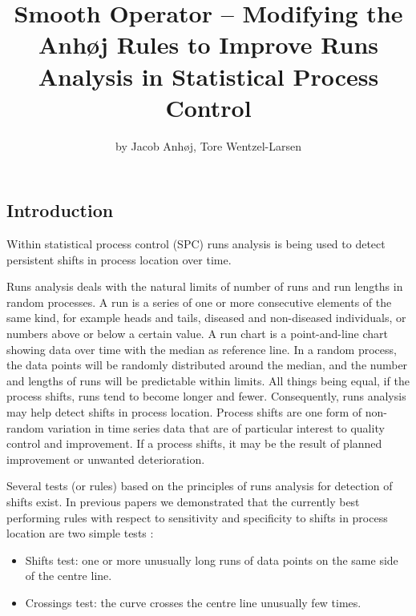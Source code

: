 \title{Smooth Operator -- Modifying the Anhøj Rules to Improve Runs Analysis in
Statistical Process Control}
\author{by Jacob Anhøj, Tore Wentzel-Larsen}

\maketitle



\hypertarget{introduction}{%
\subsection{Introduction}\label{introduction}}

Within statistical process control (SPC) runs analysis is being used to
detect persistent shifts in process location over time.

Runs analysis deals with the natural limits of number of runs and run
lengths in random processes. A run is a series of one or more
consecutive elements of the same kind, for example heads and tails,
diseased and non-diseased individuals, or numbers above or below a
certain value. A run chart is a point-and-line chart showing data over
time with the median as reference line. In a random process, the data
points will be randomly distributed around the median, and the number
and lengths of runs will be predictable within limits. All things being
equal, if the process shifts, runs tend to become longer and fewer.
Consequently, runs analysis may help detect shifts in process location.
Process shifts are one form of non-random variation in time series data
that are of particular interest to quality control and improvement. If a
process shifts, it may be the result of planned improvement or unwanted
deterioration.

Several tests (or rules) based on the principles of runs analysis for
detection of shifts exist. In previous papers we demonstrated that the
currently best performing rules with respect to sensitivity and
specificity to shifts in process location are two simple tests
\citep{anhoej2014, anhoej2015, anhoej2018}:

\begin{itemize}
\item
  Shifts test: one or more unusually long runs of data points on the
  same side of the centre line.
\item
  Crossings test: the curve crosses the centre line unusually few times.
\end{itemize}

